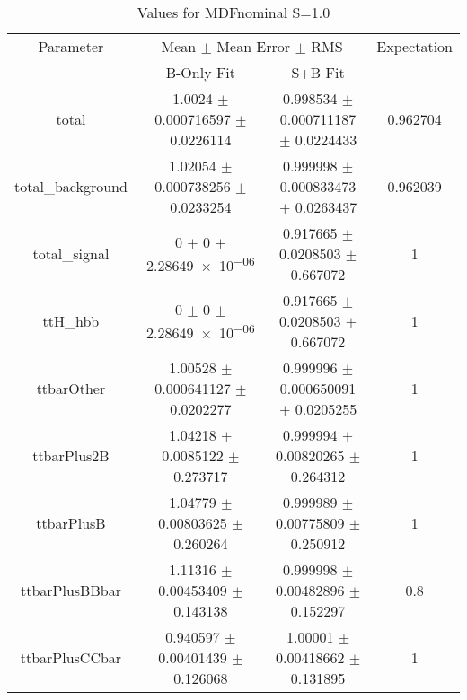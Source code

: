 \begin{table}
\centering
\caption{Values for MDFnominal S=1.0}
\begin{tabular}{cccc}
\toprule
Parameter & \multicolumn{2}{c}{Mean $\pm$ Mean Error $\pm$ RMS} & Expectation\\
 & B-Only Fit & S+B Fit & \\
\midrule
total & \num{1.0024} $\pm$ \num{0.000716597} $\pm$ \num{0.0226114} & \num{0.998534} $\pm$ \num{0.000711187} $\pm$ \num{0.0224433} & \num{0.962704}\\
total\_background & \num{1.02054} $\pm$ \num{0.000738256} $\pm$ \num{0.0233254} & \num{0.999998} $\pm$ \num{0.000833473} $\pm$ \num{0.0263437} & \num{0.962039}\\
total\_signal & \num{0} $\pm$ \num{0} $\pm$ \num{2.28649e-06} & \num{0.917665} $\pm$ \num{0.0208503} $\pm$ \num{0.667072} & \num{1}\\
ttH\_hbb & \num{0} $\pm$ \num{0} $\pm$ \num{2.28649e-06} & \num{0.917665} $\pm$ \num{0.0208503} $\pm$ \num{0.667072} & \num{1}\\
ttbarOther & \num{1.00528} $\pm$ \num{0.000641127} $\pm$ \num{0.0202277} & \num{0.999996} $\pm$ \num{0.000650091} $\pm$ \num{0.0205255} & \num{1}\\
ttbarPlus2B & \num{1.04218} $\pm$ \num{0.0085122} $\pm$ \num{0.273717} & \num{0.999994} $\pm$ \num{0.00820265} $\pm$ \num{0.264312} & \num{1}\\
ttbarPlusB & \num{1.04779} $\pm$ \num{0.00803625} $\pm$ \num{0.260264} & \num{0.999989} $\pm$ \num{0.00775809} $\pm$ \num{0.250912} & \num{1}\\
ttbarPlusBBbar & \num{1.11316} $\pm$ \num{0.00453409} $\pm$ \num{0.143138} & \num{0.999998} $\pm$ \num{0.00482896} $\pm$ \num{0.152297} & \num{0.8}\\
ttbarPlusCCbar & \num{0.940597} $\pm$ \num{0.00401439} $\pm$ \num{0.126068} & \num{1.00001} $\pm$ \num{0.00418662} $\pm$ \num{0.131895} & \num{1}\\
\bottomrule
\end{tabular}
\end{table}
